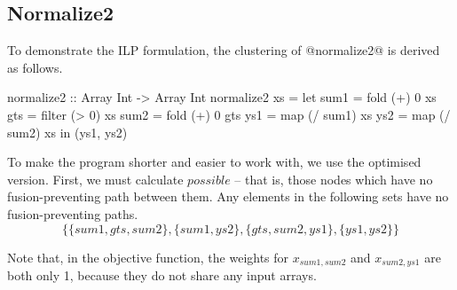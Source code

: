\subsection{Normalize2}
To demonstrate the ILP formulation, the clustering of @normalize2@ is derived as follows.
\begin{code}
 normalize2 :: Array Int -> Array Int
 normalize2 xs
  = let sum1 = fold   (+)  0   xs
        gts  = filter (>   0)  xs
        sum2 = fold   (+)  0   gts
        ys1  = map    (/ sum1) xs
        ys2  = map    (/ sum2) xs
    in (ys1, ys2)
\end{code}

To make the program shorter and easier to work with, we use the optimised version.
First, we must calculate $possible$ -- that is, those nodes which have no fusion-preventing path between them.
Any elements in the following sets have no fusion-preventing paths.
\[ \{ \{sum1, gts, sum2\}
 , \{sum1, ys2\}
 , \{gts, sum2, ys1\}
 , \{ys1, ys2\} \} \]

Note that, in the objective function, the weights for $x_{sum1, sum2}$ and $x_{sum2, ys1}$ are both only 1, because they do not share any input arrays.

